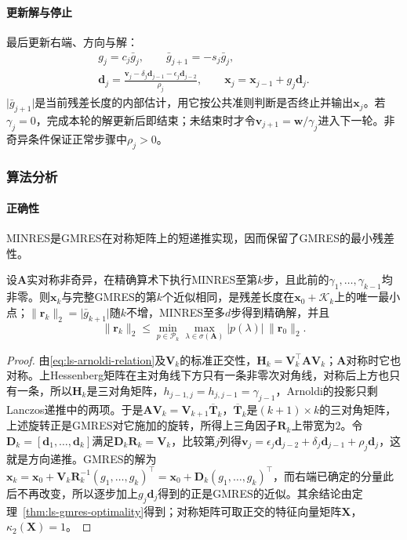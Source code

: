 \paragraph{更新解与停止}
最后更新右端、方向与解：
\[
 \begin{gathered}
 g_j=c_j\bar g_j,\qquad \bar g_{j+1}=-s_j\bar g_j,\\
 \bm d_j=\frac{\bm v_j-\delta_j\bm d_{j-1}-\epsilon_j\bm d_{j-2}}{\rho_j},\qquad
 \bm x_j=\bm x_{j-1}+g_j\bm d_j .
 \end{gathered}
\]
$\lvert\bar g_{j+1}\rvert$是当前残差长度的内部估计，用它按公共准则判断是否终止并输出$\bm x_j$。若$\gamma_j=0$，完成本轮的解更新后即结束；未结束时才令$\bm v_{j+1}=\bm w/\gamma_j$进入下一轮。非奇异条件保证正常步骤中$\rho_j>0$。

\subsubsection{算法分析}

\paragraph{正确性}
MINRES是GMRES在对称矩阵上的短递推实现，因而保留了GMRES的最小残差性。

\begin{theorem}[MINRES的最小残差性]
\label{thm:ls-minres-optimality}
设$\bm A$实对称非奇异，在精确算术下执行MINRES至第$k$步，且此前的$\gamma_1,\ldots,\gamma_{k-1}$均非零。则$\bm x_k$与完整GMRES的第$k$个近似相同，是残差长度在$\bm x_0+\mathcal K_k$上的唯一最小点；$\lVert\bm r_k\rVert_2=\lvert\bar g_{k+1}\rvert$随$k$不增，MINRES至多$d$步得到精确解，并且
\[
 \lVert\bm r_k\rVert_2\le\min_{p\in\mathcal P_k}\max_{\lambda\in\sigma(\bm A)}\lvert p(\lambda)\rvert\,\lVert\bm r_0\rVert_2 .
\]
\end{theorem}

\begin{proof}
由\eqref{eq:ls-arnoldi-relation}及$\bm V_k$的标准正交性，$\bm H_k=\bm V_k^\top\bm A\bm V_k$；$\bm A$对称时它也对称。上Hessenberg矩阵在主对角线下方只有一条非零次对角线，对称后上方也只有一条，所以$\bm H_k$是三对角矩阵，$h_{j-1,j}=h_{j,j-1}=\gamma_{j-1}$，Arnoldi的投影只剩Lanczos递推中的两项。于是$\bm A\bm V_k=\bm V_{k+1}\overline{\bm T}_k$，$\overline{\bm T}_k$是$(k+1)\times k$的三对角矩阵，上述旋转正是GMRES对它施加的旋转，所得上三角因子$\bm R_k$上带宽为$2$。令$\bm D_k=[\bm d_1,\ldots,\bm d_k]$满足$\bm D_k\bm R_k=\bm V_k$，比较第$j$列得$\bm v_j=\epsilon_j\bm d_{j-2}+\delta_j\bm d_{j-1}+\rho_j\bm d_j$，这就是方向递推。GMRES的解为$\bm x_k=\bm x_0+\bm V_k\bm R_k^{-1}(g_1,\ldots,g_k)^\top=\bm x_0+\bm D_k(g_1,\ldots,g_k)^\top$，而右端已确定的分量此后不再改变，所以逐步加上$g_j\bm d_j$得到的正是GMRES的近似。其余结论由定理~\ref{thm:ls-gmres-optimality}得到；对称矩阵可取正交的特征向量矩阵$\bm X$，$\kappa_2(\bm X)=1$。
\end{proof}

